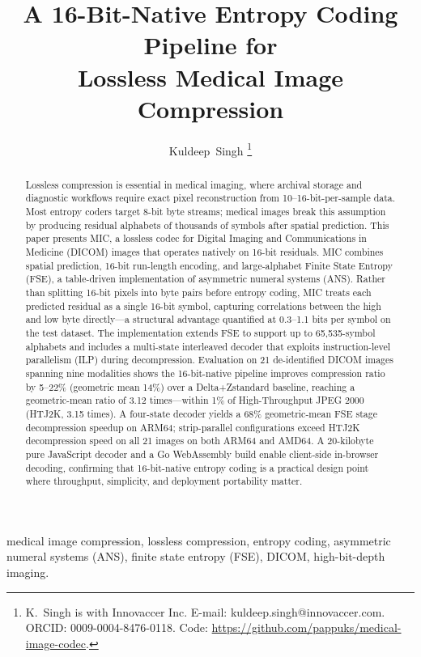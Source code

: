 \documentclass[journal]{IEEEtran}
\title{A 16-Bit-Native Entropy Coding Pipeline for\\
       Lossless Medical Image Compression}
\author{Kuldeep~Singh%
\thanks{K.\ Singh is with Innovaccer Inc.
E-mail: kuldeep.singh@innovaccer.com.
ORCID: 0009-0004-8476-0118.
Code: \url{https://github.com/pappuks/medical-image-codec}.}%
}
\begin{document}
\maketitle

\begin{abstract}
Lossless compression is essential in medical imaging, where archival storage
and diagnostic workflows require exact pixel reconstruction from
10--16-bit-per-sample data. Most entropy coders target 8-bit byte streams;
medical images break this assumption by producing residual alphabets of
thousands of symbols after spatial prediction. This paper presents MIC, a
lossless codec for Digital Imaging and Communications in Medicine (DICOM)
images that operates natively on 16-bit residuals. MIC combines spatial
prediction, 16-bit run-length encoding, and large-alphabet Finite State
Entropy (FSE), a table-driven implementation of asymmetric numeral systems
(ANS). Rather than splitting 16-bit pixels into byte pairs before entropy
coding, MIC treats each predicted residual as a single 16-bit symbol,
capturing correlations between the high and low byte directly---a structural
advantage quantified at 0.3--1.1 bits per symbol on the test dataset. The
implementation extends FSE to support up to 65,535-symbol alphabets and
includes a multi-state interleaved decoder that exploits
instruction-level parallelism (ILP) during decompression. Evaluation on 21
de-identified DICOM images spanning nine modalities shows the 16-bit-native
pipeline improves compression ratio by 5--22\% (geometric mean 14\%) over a
Delta+Zstandard baseline, reaching a geometric-mean ratio of 3.12
times---within 1\% of High-Throughput JPEG 2000 (HTJ2K, 3.15 times). A
four-state decoder yields a 68\% geometric-mean FSE stage decompression
speedup on ARM64; strip-parallel configurations exceed HTJ2K decompression
speed on all 21 images on both ARM64 and AMD64. A 20-kilobyte pure JavaScript
decoder and a Go WebAssembly build enable client-side in-browser
decoding, confirming that 16-bit-native entropy coding is a practical design
point where throughput, simplicity, and deployment portability matter.
\end{abstract}

\begin{IEEEkeywords}
medical image compression, lossless compression, entropy coding, asymmetric
numeral systems (ANS), finite state entropy (FSE), DICOM, high-bit-depth
imaging.
\end{IEEEkeywords}
\end{document}
